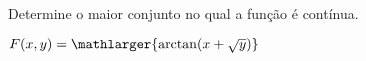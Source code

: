 
Determine o maior conjunto no qual a função é contínua.

$F(x,y)=\mathlarger{\arctan (x+\sqrt{y})}$

